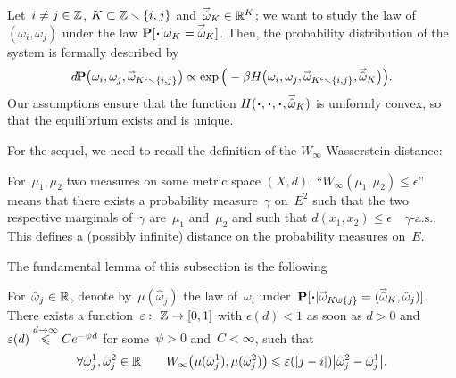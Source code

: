 Let~$i\neq j\in\mathbb{Z}$, $K\subset\mathbb{Z}\smallsetminus\{i,j\}$ and~$\vechat{\omega}_K \in \RR^K$;
we want to study the law of~$(\omega_i,\omega_j)$
under the law $\Pr[\Bcdot|\vec\omega_K=\vechat{\omega}_K]$.
Then, the probability distribution of the system is formally described by
\[ \dx\Pr \big( \omega_i,\omega_j,\vec\omega_{\C{K}\setminus\{i,j\}} \big) \propto
\exp \Big( -\beta
H \big(\omega_i,\omega_j,\vec\omega_{\C{K}\setminus\{i,j\}},\vechat{\omega}_K\big) \Big) .\]
%
Our assumptions ensure that the function
$H(\Bcdot,\Bcdot,\Bcdot,\vechat{\omega}_K)$ is uniformly convex,
so that the equilibrium exists and is unique.

For the sequel, we need to recall the definition of the $W_{\infty}$ Wasserstein distance:
%
\begin{Def}
For~$\mu_1,\mu_2$ two measures on some metric space $(X,d)$,
``$W_{\infty}(\mu_1,\mu_2) \leq \epsilon$'' means that there exists a probability measure~$\gamma$
on~$E^2$ such that the two respective marginals of~$\gamma$ are~$\mu_1$ and~$\mu_2$
and such that $d(x_1,x_2) \leq \epsilon \quad \gamma\text{-a.s.}$.
This defines a (possibly infinite) distance on the probability measures on~$E$.
\end{Def}

The fundamental lemma of this subsection is the following
\begin{Clm}\label{lem7014}
For~$\hat\omega_j \in \RR$, denote by~$\mu(\hat\omega_j)$ the law of~$\omega_i$
under~$\Pr[\Bcdot|\ab \vec{\omega}_{K\uplus\{j\}}=(\vechat{\omega}_K,\hat\omega_j)]$.
There exists a function~$\epsilon \colon \ZZ \to [0,1]$ with
$\epsilon(d) < 1$ as soon as $d > 0$ and $\varepsilon(d) \stackrel{d\to\infty}{\leqslant} Ce^{-\psi d}$
for some~${\psi > 0}$ and~${C < \infty}$, such that
\[ \forall \hat\omega_j^1, \hat\omega_j^2 \in \RR \qquad
W_\infty \big( \mu(\hat\omega_j^1), \mu(\hat\omega_j^2) \big)
\leq \epsilon(|j-i|) \big| \hat\omega_j^2 - \hat\omega_j^1 \big| .\]
\end{Clm}

